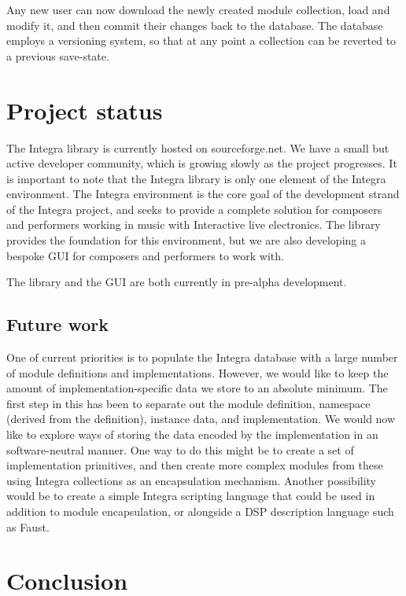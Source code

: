 Any new user can now download the newly created module collection,
load and modify it, and then commit their changes back to the
database. The database employs a versioning system, so that at any
point a collection can be reverted to a previous save-state.

\section{Project status}\label{sec:status}

The Integra library is currently hosted on sourceforge.net. We have a
small but active developer community, which is growing slowly as the
project progresses. It is important to note that the Integra library
is only one element of the Integra environment. The Integra
environment is the core goal of the development strand of the Integra
project, and seeks to provide a complete solution for composers and
performers working in music with Interactive live electronics. The
library provides the foundation for this environment, but we are also
developing a bespoke GUI for composers and performers to work with.

The library and the GUI are both currently in pre-alpha development.

\subsection{Future work}\label{subsec:future}

One of current priorities is to populate the Integra database with a
large number of module definitions and implementations. However, we
would like to keep the amount of implementation-specific data we store
to an absolute minimum. The first step in this has been to separate
out the module definition, namespace (derived from the definition),
instance data, and implementation. We would now like to explore ways
of storing the data encoded by the implementation in an
software-neutral manner. One way to do this might be to create a set
of implementation primitives, and then create more complex modules
from these using Integra collections as an encapsulation mechanism.
Another possibility would be to create a simple Integra scripting
language that could be used in addition to module encapsulation, or
alongside a DSP description language such as Faust.

\section{Conclusion}\label{sec:conclusion}

